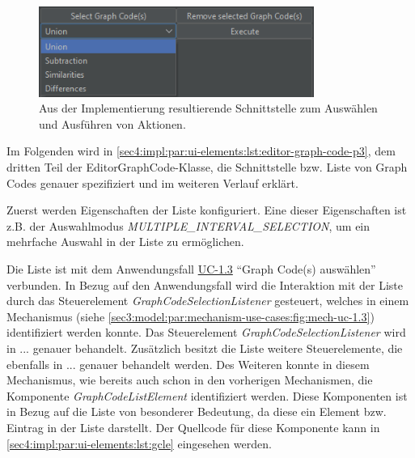 \begin{figure}[!ht]
  \includegraphics[width=9cm]{chapter/chapter_4/wireframe-impl-ui-4}
  \caption{Aus der Implementierung resultierende Schnittstelle zum Auswählen und Ausführen von Aktionen.}
  \label{sec4:impl:par:ui-elements:fig:wireframe-ui-4}
\end{figure}

Im Folgenden wird in \cref{sec4:impl:par:ui-elements:lst:editor-graph-code-p3}, dem dritten Teil der EditorGraphCode-Klasse, die Schnittstelle  bzw. Liste von Graph Codes genauer spezifiziert und im weiteren Verlauf erklärt.





Zuerst werden Eigenschaften der Liste konfiguriert.
Eine dieser Eigenschaften ist z.B. der Auswahlmodus \textit{MULTIPLE\_INTERVAL\_SELECTION}, um ein mehrfache Auswahl in der Liste zu ermöglichen.

Die Liste ist mit dem Anwendungsfall \hyperref[sec3:model:uc-1.3]{UC-1.3} \enquote{Graph Code(s) auswählen} verbunden.
In Bezug auf den Anwendungsfall wird die Interaktion mit der Liste durch das Steuerelement \textit{GraphCodeSelectionListener} gesteuert, welches in einem Mechanismus (siehe \cref{sec3:model:par:mechanism-use-cases:fig:mech-uc-1.3}) identifiziert werden konnte.
Das Steuerelement \textit{GraphCodeSelectionListener} wird in ... genauer behandelt.
Zusätzlich besitzt die Liste weitere Steuerelemente, die ebenfalls in ... genauer behandelt werden.
Des Weiteren konnte in diesem Mechanismus, wie bereits auch schon in den vorherigen Mechanismen, die Komponente \textit{GraphCodeListElement} identifiziert werden.
Diese Komponenten ist in Bezug auf die Liste von besonderer Bedeutung, da diese ein Element bzw. Eintrag in der Liste darstellt.
Der Quellcode für diese Komponente kann in \cref{sec4:impl:par:ui-elements:lst:gcle} eingesehen werden.

